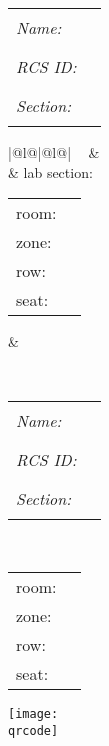 \documentclass[11pt]{article}
\makeatletter
\newcommand{\fillinname}
{
\begin{minipage}{3.2in}
\begin{tabular}{lr}
{\em Name:} & \rule{2.5in}{0.4pt} \vspace{0.2in} \\ 
{\em RCS ID:} & \rule{2.5in}{0.4pt} \vspace{0.2in} \\ 
{\em Section:} & \rule{2.5in}{0.4pt}
\end{tabular}
\end{minipage}
}
\newcommand{\studentname}
{
\renewcommand{\arraystretch}{1.5}
\begin{tabular}{|@{\hspace{0.1in}}l@{\hspace{0.1in}}|@{\hspace{0.1in}}l@{\hspace{0.1in}}|}
\hline
\multirow{2}{2.4in}
{\bf \Large \studentfirstname ~ \studentlastname}
&
\studentemail
\\
%
&
lab section: \studentlabsection
\\
%
\hline
%
\begin{minipage}{2.5in}
\begin{tabular}{ll}
\vspace{-0.08in}
room:& \studentroom \\
\vspace{-0.08in}
zone:& \studentzone \\
\vspace{-0.08in}
row:& \studentrow \\
\vspace{-0.08in}
seat:& \studentseat
\end{tabular}
\medskip \end{minipage}  &
\begin{minipage}{2in} \smallskip \studenttime \smallskip \end{minipage}
\\
\hline
%
\end{tabular}
\renewcommand{\arraystretch}{1.0}
}
\newcommand{\zoneonly}
{
\fillinname
\hfill
\begin{minipage}{1.5in}
\renewcommand{\arraystretch}{1.5}
{\bf \Large \studentfirstname ~ \studentlastname} \vspace{0.1in} \\
\begin{tabular}{ll}
\vspace{-0.08in}
room:& \studentroom \\
\vspace{-0.08in}
zone:& \studentzone \\
\vspace{-0.08in}
row:& \studentrow \\
\vspace{-0.08in}
seat:& \studentseat 
\end{tabular}
\renewcommand{\arraystretch}{1.0}
\end{minipage}
}
\makeatother
\begin{document}
\vspace*{0.6in}
\thispagestyle{plain}

\beginnone
\begin{minipage}{5.3in}
\fillinname
\end{minipage}
\fi
%
\beginzoneandname
\begin{minipage}{5.3in}
\studentname
\end{minipage}
\fi
%
\beginzoneonly
\begin{minipage}{5.3in}
\zoneonly
\end{minipage}
\fi
%
\hfill
\begin{minipage}{2.0in}
\texttt{[image: \\qrcode]}
\end{minipage}

\newpage

~
\end{document}
